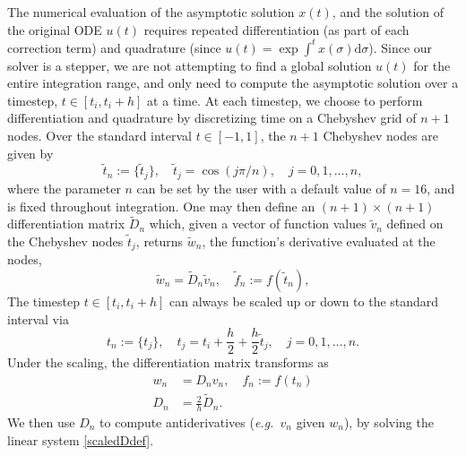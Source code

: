 \documentclass[10pt]{article}
\newcommand{\be}{\begin{equation}}
\newcommand{\ee}{\end{equation}}
\newcommand{\eg}{{\it e.g.\ }}
\newcommand{\om}{\omega}
\newcommand{\AB}[1]{{\color{orange}#1}}
\begin{document}
The numerical evaluation of the asymptotic solution $x(t)$, and the solution of
the original ODE $u(t)$ requires repeated differentiation (as part of each
correction term) and quadrature (since $u(t) = \exp \int^t x(\sigma)
\mathrm{d}\sigma$). 
Since our solver is a stepper, we are not attempting to find a global solution
$u(t)$ for the entire integration range, and only need to compute the
asymptotic solution over a timestep, $t \in [t_i, t_i+h]$ at a time. At each 
timestep, we choose to perform differentiation and quadrature by discretizing
time on a Chebyshev grid of $n + 1$ nodes.  
Over the standard interval $t \in [-1, 1]$, the $n+1$ Chebyshev nodes are given by 
\be\label{chebnodes}
\tilde{t}_n := \{\tilde{t}_j\}, \quad \tilde{t}_j = \cos\left( j\pi/n\right), \quad j = 0, 1, \ldots, n,
\ee
where the parameter $n$ can be set by the user with a default value of $n = 16$, and is fixed throughout integration. 
One may then define an $(n+1) \times (n+1)$ differentiation matrix $\tilde{D}_n$ which, given a vector of function
values $\tilde{v}_n$ defined on the Chebyshev nodes $\tilde{t}_j$, returns $\tilde{w}_n$, the function's
derivative evaluated at the nodes,
\be\label{diffmat}
\tilde{w}_n = \tilde{D}_n\tilde{v}_n, \quad \tilde{f}_n := f(\tilde{t}_n),
\ee
The timestep $t \in [t_i, t_i+h]$ can always be scaled up or down to the standard interval via
\be\label{scaledt}
t_n := \{ t_j \}, \quad t_j = t_i + \frac{h}{2} + \frac{h}{2}\tilde{t}_j, \quad j = 0, 1, \ldots, n. 
\ee
Under the scaling, the differentiation matrix transforms as
\begin{align}
    w_n &= D_nv_n, \quad f_n := f(t_n) \label{scaledDdef}\\
    D_n &= \frac{2}{h}\tilde{D}_n. \label{scaledD}
\end{align}
We then use $D_n$ to compute antiderivatives (\eg $v_n$ given $w_n$), by
solving the
linear system \cref{scaledDdef}. 

\end{document}
